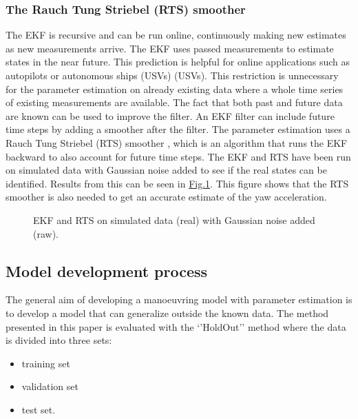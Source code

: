 \documentclass[review]{elsarticle}
\begin{document}
\subsubsection{The Rauch Tung Striebel (RTS) smoother}
\label{\detokenize{04.01_EK:the-rauch-tung-striebel-rts-smoother}}\label{\detokenize{04.01_EK:rts}}
\sphinxAtStartPar
The EKF is recursive and can be run online, continuously making new estimates as new measurements arrive. The EKF uses passed measurements to estimate states in the near future. This prediction is helpful for online applications such as  autopilots or autonomous ships (USVs) (USVs). This restriction is  unnecessary for the parameter estimation on already existing data where a whole time series of existing measurements are available. The fact that both past and future data are known can be used to improve the filter. An EKF filter can include future time steps by adding a smoother after the filter. The parameter estimation uses a Rauch Tung Striebel (RTS) smoother \cite{rauch_maximum_1965}, which is an algorithm that runs the EKF backward to also account for future time steps.
The EKF and RTS have been run on simulated data with Gaussian noise added to see if the real states can be identified. Results from this can be seen in  \hyperref[\detokenize{04.01_EK:fig-ekf}]{Fig.\@ \ref{\detokenize{04.01_EK:fig-ekf}}}. This figure shows that the RTS smoother is also needed to get an accurate estimate of the yaw acceleration.

\begin{figure}[H]
\centering
\capstart

\noindent{}
\caption{EKF and RTS on simulated data (real) with Gaussian noise added (raw).}\label{\detokenize{04.01_EK:fig-ekf}}\end{figure}


\subsection{Model development process}
\label{\detokenize{04.10_model_development_process:id1}}\label{\detokenize{04.10_model_development_process::doc}}
\sphinxAtStartPar
The general aim of developing a manoeuvring model with parameter estimation is to develop a model that can generalize outside the known data. The method presented in this paper is evaluated with the ‘’Hold\sphinxhyphen{}Out’’ method where the data is divided into three sets:
\begin{itemize}
\item {} 
\sphinxAtStartPar
training set

\item {} 
\sphinxAtStartPar
validation set

\item {} 
\sphinxAtStartPar
test set.

\end{itemize}
\end{document}

